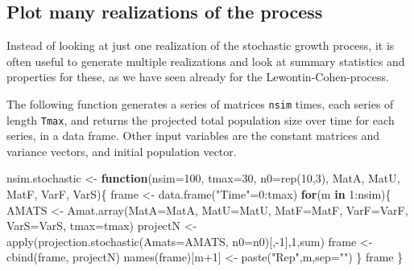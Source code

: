\documentclass[
]{book}
\newenvironment{Shaded}{\begin{snugshade}}{\end{snugshade}}
\newcommand{\AttributeTok}[1]{\textcolor[rgb]{0.77,0.63,0.00}{#1}}
\newcommand{\ControlFlowTok}[1]{\textcolor[rgb]{0.13,0.29,0.53}{\textbf{#1}}}
\newcommand{\DecValTok}[1]{\textcolor[rgb]{0.00,0.00,0.81}{#1}}
\newcommand{\FunctionTok}[1]{\textcolor[rgb]{0.00,0.00,0.00}{#1}}
\newcommand{\NormalTok}[1]{#1}
\newcommand{\OtherTok}[1]{\textcolor[rgb]{0.56,0.35,0.01}{#1}}
\newcommand{\SpecialCharTok}[1]{\textcolor[rgb]{0.00,0.00,0.00}{#1}}
\newcommand{\StringTok}[1]{\textcolor[rgb]{0.31,0.60,0.02}{#1}}
\begin{document}
\hypertarget{plot-many-realizations-of-the-process-1}{%
\subsection*{Plot many realizations of the process}\label{plot-many-realizations-of-the-process-1}}

Instead of looking at just one realization of the stochastic growth process, it is often useful to generate multiple realizations and look at summary statistics and properties for these, as we have seen already for the Lewontin-Cohen-process.

The following function generates a series of matrices \texttt{nsim} times, each series of length \texttt{Tmax}, and returns the projected total population size over time for each series, in a data frame. Other input variables are the constant matrices and variance vectors, and initial population vector.

\begin{Shaded}
\begin{Highlighting}[]
\NormalTok{nsim.stochastic }\OtherTok{\textless{}{-}} \ControlFlowTok{function}\NormalTok{(}\AttributeTok{nsim=}\DecValTok{100}\NormalTok{, }\AttributeTok{tmax=}\DecValTok{30}\NormalTok{, }\AttributeTok{n0=}\FunctionTok{rep}\NormalTok{(}\DecValTok{10}\NormalTok{,}\DecValTok{3}\NormalTok{), MatA, MatU, MatF, VarF, VarS)\{}
\NormalTok{  frame }\OtherTok{\textless{}{-}}  \FunctionTok{data.frame}\NormalTok{(}\StringTok{"Time"}\OtherTok{=}\DecValTok{0}\SpecialCharTok{:}\NormalTok{tmax)}
  \ControlFlowTok{for}\NormalTok{(m }\ControlFlowTok{in} \DecValTok{1}\SpecialCharTok{:}\NormalTok{nsim)\{}
\NormalTok{  AMATS }\OtherTok{\textless{}{-}} \FunctionTok{Amat.array}\NormalTok{(}\AttributeTok{MatA=}\NormalTok{MatA, }\AttributeTok{MatU=}\NormalTok{MatU, }\AttributeTok{MatF=}\NormalTok{MatF, }\AttributeTok{VarF=}\NormalTok{VarF, }\AttributeTok{VarS=}\NormalTok{VarS, }\AttributeTok{tmax=}\NormalTok{tmax)}
\NormalTok{   projectN }\OtherTok{\textless{}{-}} \FunctionTok{apply}\NormalTok{(}\FunctionTok{projection.stochastic}\NormalTok{(}\AttributeTok{Amats=}\NormalTok{AMATS, }\AttributeTok{n0=}\NormalTok{n0)[,}\SpecialCharTok{{-}}\DecValTok{1}\NormalTok{],}\DecValTok{1}\NormalTok{,sum)}
\NormalTok{  frame }\OtherTok{\textless{}{-}} \FunctionTok{cbind}\NormalTok{(frame, projectN)}
  \FunctionTok{names}\NormalTok{(frame)[m}\SpecialCharTok{+}\DecValTok{1}\NormalTok{] }\OtherTok{\textless{}{-}} \FunctionTok{paste}\NormalTok{(}\StringTok{"Rep"}\NormalTok{,m,}\AttributeTok{sep=}\StringTok{""}\NormalTok{)}
\NormalTok{  \}}
\NormalTok{  frame}
\NormalTok{\}}
\end{Highlighting}
\end{Shaded}
\end{document}

